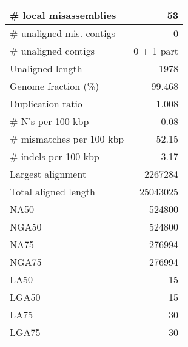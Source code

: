 \documentclass[12pt,a4paper]{article}
\begin{document}
\begin{table}[ht]
\begin{center}
\begin{tabular}{|l*{1}{|r}|}
\# local misassemblies & 53 \\ \hline
\# unaligned mis. contigs & 0 \\ \hline
\# unaligned contigs & 0 + 1 part \\ \hline
Unaligned length & 1978 \\ \hline
Genome fraction (\%) & 99.468 \\ \hline
Duplication ratio & 1.008 \\ \hline
\# N's per 100 kbp & 0.08 \\ \hline
\# mismatches per 100 kbp & 52.15 \\ \hline
\# indels per 100 kbp & 3.17 \\ \hline
Largest alignment & 2267284 \\ \hline
Total aligned length & 25043025 \\ \hline
NA50 & 524800 \\ \hline
NGA50 & 524800 \\ \hline
NA75 & 276994 \\ \hline
NGA75 & 276994 \\ \hline
LA50 & 15 \\ \hline
LGA50 & 15 \\ \hline
LA75 & 30 \\ \hline
LGA75 & 30 \\ \hline
\end{tabular}
\end{center}
\end{table}
\end{document}
